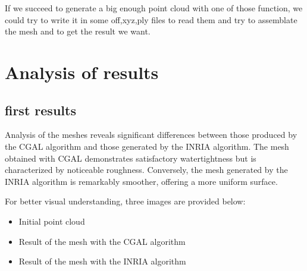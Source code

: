\documentclass{article}
\begin{document}
If we succeed to generate a big enough point cloud with one of those function, we could try to write it in some off,xyz,ply files to read them and try to assemblate the mesh and to get the result we want.


\section{Analysis of results}
\subsection{first results}
Analysis of the meshes reveals significant differences between those produced by the CGAL algorithm and those generated by the INRIA algorithm. The mesh obtained with CGAL demonstrates satisfactory watertightness but is characterized by noticeable roughness. Conversely, the mesh generated by the INRIA algorithm is remarkably smoother, offering a more uniform surface.

For better visual understanding, three images are provided below:

\begin{itemize}
    \item Initial point cloud
    \item Result of the mesh with the CGAL algorithm
    \item Result of the mesh with the INRIA algorithm
\end{itemize}
\end{document}
